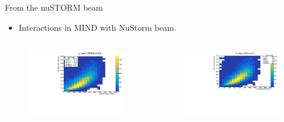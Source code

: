 \documentclass[11pt]{beamer}
\begin{document}
\begin{frame}{From the nuSTORM beam}
\begin{block}{}
	\begin{tiny}
		\begin{itemize}
\item Interactions in MIND with NuStorm beam.
		\end{itemize}
	\end{tiny}
\end{block}
\begin{columns}[T] %
	\begin{column}{.48\textwidth}
		
		\begin{figure}[h!]
			\centering
			\includegraphics[width=\textwidth]{NuStorm/MomentumNeutrinoBeamMIND.pdf}
		\end{figure}
	\end{column}%
	\begin{column}{.48\textwidth}
		\begin{figure}[h!]
			\centering
			\includegraphics[width=\textwidth]{NuStorm/MomentumAntiNeutrinoBeamMIND.pdf}
		\end{figure}
	\end{column}%
\end{columns}
\end{frame}
\end{document}
